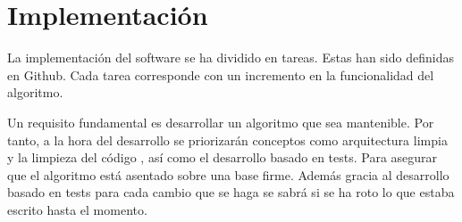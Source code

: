 \chapter{Implementación}

La implementación del software se ha dividido en tareas. Estas han sido definidas en Github. Cada tarea corresponde con un 
incremento en la funcionalidad del algoritmo.

Un requisito fundamental es desarrollar un algoritmo que sea mantenible. Por tanto, a la hora del desarrollo se priorizarán conceptos 
como arquitectura limpia \cite{cleanArquitecture2017} y la limpieza del código \cite{cleanCode2008}, así como el desarrollo basado en tests. Para asegurar 
que el algoritmo está asentado sobre una base firme. Además gracia al desarrollo basado en tests para cada cambio que se haga 
se sabrá si se ha roto lo que estaba escrito hasta el momento. 

